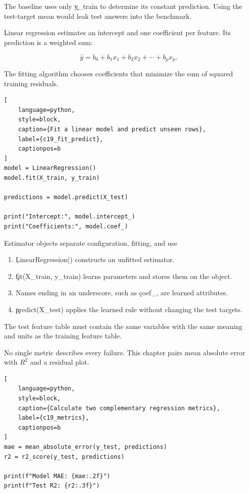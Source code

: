 The baseline uses only \c{y_train} to determine its constant prediction. Using
the test-target mean would leak test answers into the benchmark.


Linear regression estimates an intercept and one coefficient per feature. Its
prediction is a weighted sum:

\[
\hat{y} = b_0 + b_1x_1 + b_2x_2 + \cdots + b_px_p.
\]

The fitting algorithm chooses coefficients that minimize the sum of squared
training residuals.

\begin{lstlisting}[
    language=python,
    style=block,
    caption={Fit a linear model and predict unseen rows},
    label={c19_fit_predict},
    captionpos=b
]
model = LinearRegression()
model.fit(X_train, y_train)

predictions = model.predict(X_test)

print("Intercept:", model.intercept_)
print("Coefficients:", model.coef_)
\end{lstlisting}

\begin{SyntaxBox}{Estimator objects separate configuration, fitting, and use}
\begin{enumerate}
    \item \c{LinearRegression()} constructs an unfitted estimator.
    \item \c{fit(X_train, y_train)} learns parameters and stores them on the object.
    \item Names ending in an underscore, such as \c{coef_}, are learned attributes.
    \item \c{predict(X_test)} applies the learned rule without changing the test targets.
\end{enumerate}
The test feature table must contain the same variables with the same meaning
and units as the training feature table.
\end{SyntaxBox}


No single metric describes every failure. This chapter pairs mean absolute
error with $R^2$ and a residual plot.

\begin{lstlisting}[
    language=python,
    style=block,
    caption={Calculate two complementary regression metrics},
    label={c19_metrics},
    captionpos=b
]
mae = mean_absolute_error(y_test, predictions)
r2 = r2_score(y_test, predictions)

print(f"Model MAE: {mae:.2f}")
print(f"Test R2: {r2:.3f}")
\end{lstlisting}

